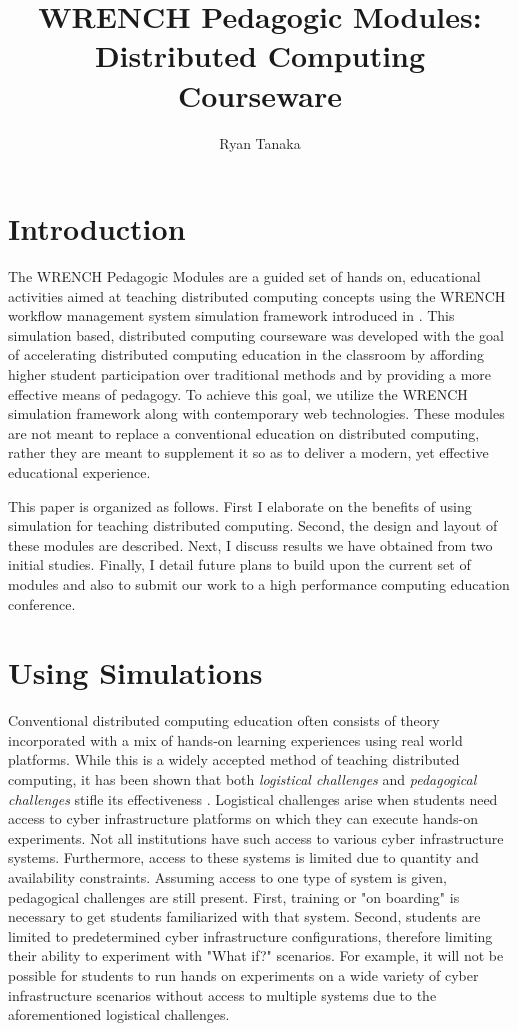 \documentclass{article}
\begin{document}
\title{WRENCH Pedagogic Modules: Distributed Computing Courseware}
\author{Ryan Tanaka}

\maketitle

\section{Introduction}
The WRENCH Pedagogic Modules are a guided set of hands on, educational
activities aimed at teaching distributed computing concepts using the WRENCH
workflow management system simulation framework introduced in \cite{wrench}.
This simulation based, distributed computing courseware was developed with the
goal of accelerating distributed computing education in the classroom by
affording higher student participation over traditional methods and by providing
a more effective means of pedagogy. To achieve this goal, we utilize the WRENCH
simulation framework along with contemporary web technologies. These modules are
not meant to replace a conventional education on distributed computing, rather
they are meant to supplement it so as to deliver a modern, yet effective
educational  experience.

This paper is organized as follows. First I elaborate on the benefits of using
simulation for teaching  distributed computing. Second, the design and layout of
these modules are described. Next, I discuss results we have obtained from two
initial studies. Finally, I detail future plans to build upon the current set of
modules and also to submit our work to a high performance computing education
conference.

\section{Using Simulations}
Conventional distributed computing education often consists of theory
incorporated with a mix of hands-on learning experiences using real world
platforms. While this is a widely accepted method of teaching distributed computing,
it has been shown that both \textit{logistical challenges} and \textit{pedagogical challenges}
stifle its effectiveness \cite{smpi-courseware}. Logistical challenges arise when
students need access to cyber infrastructure platforms on which they can execute
hands-on experiments. Not all institutions have such access to various 
cyber infrastructure systems. Furthermore, access to these systems is limited due
to quantity and availability constraints. Assuming access to one type of system is
given, pedagogical challenges are still present. First, training or "on boarding" is necessary
to get students familiarized with that system. Second, students are limited to 
predetermined cyber infrastructure configurations, therefore limiting their ability to
experiment with "What if?" scenarios. For example, it will not be possible for students to 
run hands on experiments on a wide variety of cyber infrastructure scenarios without
access to multiple systems due to the aforementioned 
logistical challenges. 
\end{document}
